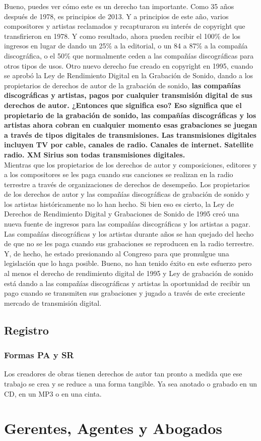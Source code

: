\documentclass[10pt]{book}
\begin{document}
Bueno, puedes ver cómo este es un derecho tan importante. Como 35 años después de 1978, es principios de 2013. Y a principios de este año, varios compositores y artistas reclamados y recapturaron su interés de copyright que transfirieron en 1978. Y como resultado, ahora pueden recibir el 100\% de los ingresos en lugar de dando un 25\% a la editorial, o un 84 a 87\% a la compañía discográfica, o el 50\% que normalmente ceden a las compañías discográficas para otros tipos de usos. Otro nuevo derecho fue creado en copyright en 1995, cuando se aprobó la Ley de Rendimiento Digital en la Grabación de Sonido, dando a los propietarios de derechos de autor de la grabación de sonido, \textbf{las compañías discográficas y artistas, pagos por cualquier transmisión digital de sus derechos de autor. ¿Entonces que significa eso? Eso significa que el propietario de la grabación de sonido, las compañías discográficas y los artistas ahora cobran en cualquier momento esas grabaciones se juegan a través de tipos digitales de transmisiones. Las transmisiones digitales incluyen TV por cable, canales de radio. Canales de internet. Satellite radio. XM Sirius son todas transmisiones digitales.}\\
Mientras que los propietarios de los derechos de autor y composiciones, editores y a los compositores se les paga cuando sus canciones se realizan en la radio terrestre a través de organizaciones de derechos de desempeño. Los propietarios de los derechos de autor y las compañías discográficas de grabación de sonido y los artistas históricamente no lo han hecho. Si bien eso es cierto, la Ley de Derechos de Rendimiento Digital y Grabaciones de Sonido de 1995 creó una nueva fuente de ingresos para las compañías discográficas y los artistas a pagar. Las compañías discográficas y los artistas durante años se han quejado del hecho de que no se les paga cuando sus grabaciones se reproducen en la radio terrestre. Y, de hecho, he estado presionando al Congreso para que promulgue una legislación que lo haga posible. Bueno, no han tenido éxito en este esfuerzo pero al menos el derecho de rendimiento digital de 1995 y Ley de grabación de sonido está dando a las compañías discográficas y artistas la oportunidad de recibir un pago cuando se transmiten sus grabaciones y jugado a través de este creciente mercado de transmisión digital.
\section{Registro}
\subsection{Formas PA y SR}
Los creadores de obras tienen derechos de autor tan pronto a medida que ese trabajo se crea y se reduce a una forma tangible. Ya sea anotado o grabado en un CD, en un MP3 o en una cinta.





 
\chapter{Gerentes, Agentes y Abogados}
\end{document}
